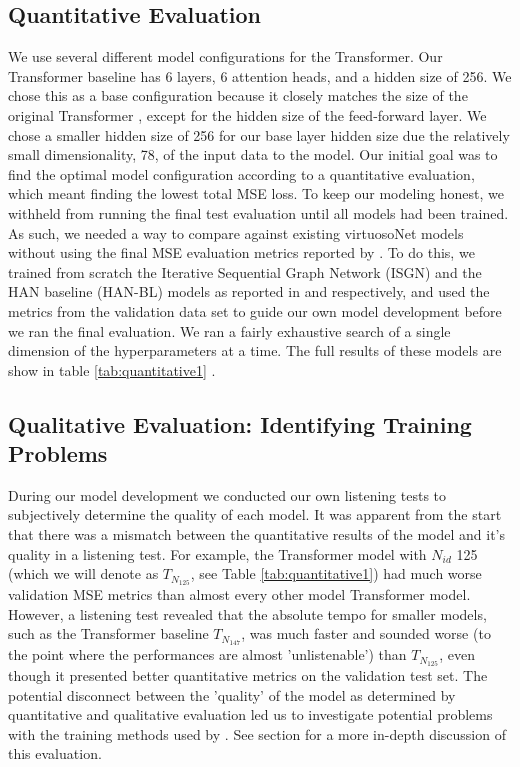 \subsection{Quantitative Evaluation}
We use several different model configurations for the Transformer. Our Transformer baseline has 6 layers, 6 attention heads, and a hidden size of 256. We chose this as a base configuration because it closely matches the size of the original Transformer \cite{vaswani2017attention}, except for the hidden size of the feed-forward layer. We chose a smaller hidden size of 256 for our base layer hidden size due the relatively small dimensionality, 78, of the input data to the model. Our initial goal was to find the optimal model configuration according to a quantitative evaluation, which meant finding the lowest total MSE loss. To keep our modeling honest, we withheld from running the final test evaluation until all models had been trained. As such, we needed a way to compare against existing virtuosoNet models without using the final MSE evaluation metrics reported by \citet{jeong2019virtuosonet}. To do this, we trained from scratch the Iterative Sequential Graph Network (ISGN) and the HAN baseline (HAN-BL) models as reported in \cite{jeong2019graph} and \cite{jeong2019virtuosonet} respectively, and used the metrics from the validation data set to guide our own model development before we ran the final evaluation. We ran a fairly exhaustive search of a single dimension of the hyperparameters at a time. The full results of these models are show in table \ref{tab:quantitative1} . 

\subsection{Qualitative Evaluation: Identifying Training Problems}
During our model development we conducted our own listening tests to subjectively determine the quality of each model. It was apparent from the start that there was a mismatch between the quantitative results of the model and it's quality in a listening test. For example, the Transformer model with $N_{id}$ 125 (which we will denote as $T_{N_{125}}$, see Table \ref{tab:quantitative1}) had much worse validation MSE metrics than almost every other model Transformer model. However, a listening test revealed that the absolute tempo for smaller models, such as the Transformer baseline $T_{N_{147}}$, was much faster and sounded worse (to the point where the performances are almost 'unlistenable') than $T_{N_{125}}$, even though it presented better quantitative metrics on the validation test set. The potential disconnect between the 'quality' of the model as determined by quantitative and qualitative evaluation led us to investigate potential problems with the training methods used by \citet{jeong2019virtuosonet}. See section  for a more in-depth discussion of this evaluation. 

